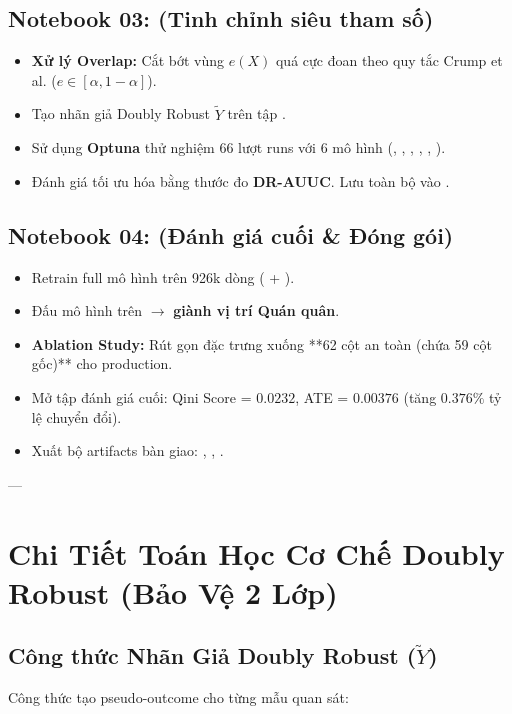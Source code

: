 \documentclass[11pt,a4paper]{article}
\begin{document}
\subsection{Notebook 03:  (Tinh chỉnh siêu tham số)}
\begin{itemize}
    \item \textbf{Xử lý Overlap:} Cắt bớt vùng $e(X)$ quá cực đoan theo quy tắc Crump et al. ($e \in [\alpha, 1-\alpha]$).
    \item Tạo nhãn giả Doubly Robust $\tilde{Y}$ trên tập .
    \item Sử dụng \textbf{Optuna} thử nghiệm 66 lượt runs với 6 mô hình (, , , , , ).
    \item Đánh giá tối ưu hóa bằng thước đo \textbf{DR-AUUC}. Lưu toàn bộ vào .
\end{itemize}

\subsection{Notebook 04:  (Đánh giá cuối \& Đóng gói)}
\begin{itemize}
    \item Retrain full mô hình trên 926k dòng ( + ).
    \item Đấu mô hình trên  $\rightarrow$ \textbf{ giành vị trí Quán quân}.
    \item \textbf{Ablation Study:} Rút gọn đặc trưng xuống **62 cột an toàn (chứa 59 cột gốc)** cho production.
    \item Mở tập  đánh giá cuối: Qini Score = $0.0232$, ATE = $0.00376$ (tăng $0.376\%$ tỷ lệ chuyển đổi).
    \item Xuất bộ artifacts bàn giao: , , .
\end{itemize}

---

\section{Chi Tiết Toán Học Cơ Chế Doubly Robust (Bảo Vệ 2 Lớp)}

\subsection{Công thức Nhãn Giả Doubly Robust ($\tilde{Y}$)}
Công thức tạo pseudo-outcome cho từng mẫu quan sát:
\end{document}
